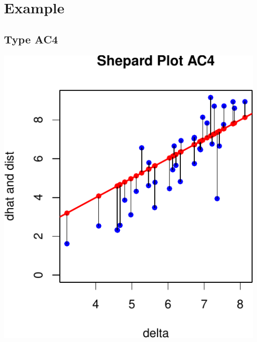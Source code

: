 \documentclass[
  12pt,
]{article}
\begin{document}
\section{Example}\label{example}

\subsection{Type AC4}\label{type-ac4}

\begin{center}\includegraphics{smacofAC_files/figure-latex/gruijterh00-1} \end{center}
\end{document}

